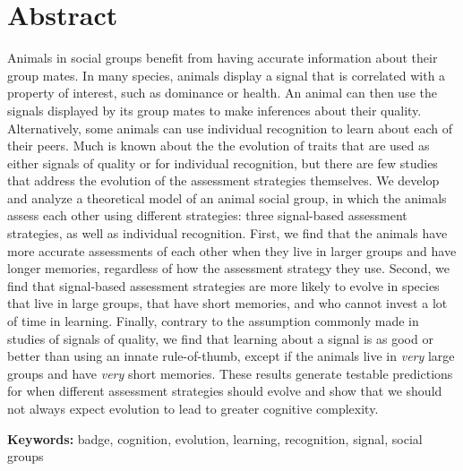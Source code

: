 \section*{Abstract}
Animals in social groups benefit from having accurate information about their group mates. In many species, animals display a signal that is correlated with a property of interest, such as dominance or health. An animal can then use the signals displayed by its group mates to make inferences about their quality. Alternatively, some animals can use individual recognition to learn about each of their peers. Much is known about the the evolution of traits that are used as either signals of quality or for individual recognition, but there are few studies that address the evolution of the assessment strategies themselves. We develop and analyze a theoretical model of an animal social group, in which the animals assess each other using different strategies: three signal-based assessment strategies, as well as individual recognition. First, we find that the animals have more accurate assessments of each other when they live in larger groups and have longer memories, regardless of how the assessment strategy they use. Second, we find that signal-based assessment strategies are more likely to evolve in species that live in large groups, that have short memories, and who cannot invest a lot of time in learning. Finally, contrary to the assumption commonly made in studies of signals of quality, we find that learning about a signal is as good or better than using an innate rule-of-thumb, except if the animals live in \emph{very} large groups and have \emph{very} short memories. These results generate testable predictions for when different assessment strategies should evolve and show that we should not always expect evolution to lead to greater cognitive complexity. 


\textbf{Keywords:} badge, cognition, evolution, learning, recognition, signal, social groups

\newpage
